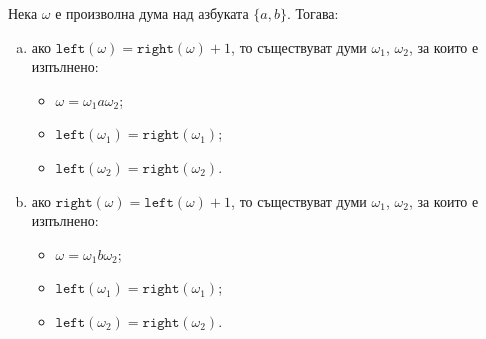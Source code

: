 \begin{problem}
  \label{prob:nanb}
  Нека $\omega$ е произволна дума над азбуката $\{a,b\}$. 
  Тогава:
  \begin{enumerate}[a)]
  \item 
    ако $\texttt{left}(\omega) = \texttt{right}(\omega) + 1$, то съществуват думи $\omega_1$, $\omega_2$, за които е изпълнено:
    \begin{itemize}
    \item 
      $\omega = \omega_1 a \omega_2$;
    \item
      $\texttt{left}(\omega_1) = \texttt{right}(\omega_1)$;
    \item
      $\texttt{left}(\omega_2) = \texttt{right}(\omega_2)$.
    \end{itemize}
  \item
    ако $\texttt{right}(\omega) = \texttt{left}(\omega) + 1$, то съществуват думи $\omega_1$, $\omega_2$, за които е изпълнено:
    \begin{itemize}
    \item 
      $\omega = \omega_1 b \omega_2$;
    \item
      $\texttt{left}(\omega_1) = \texttt{right}(\omega_1)$;
    \item
      $\texttt{left}(\omega_2) = \texttt{right}(\omega_2)$.
    \end{itemize}
  \end{enumerate}
\end{problem}

